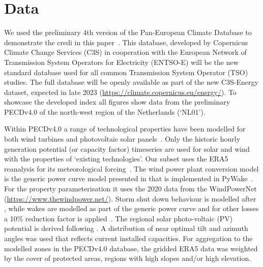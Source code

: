 \documentclass[a4paper,11pt]{extarticle}
\newcommand{\credi}[0]{{\sc credi}}
\begin{document}

\section{Data}\label{secCP2:data}
We used the preliminary 4th version of the Pan-European Climate Database to demonstrate the \credi{} in this paper~\parencite[PECDv4.0;][]{Dubus2022PECD}. 
This database, developed by Copernicus Climate Change Services (C3S) in cooperation with the European Network of Transmission System Operators for Electricity (ENTSO-E) will be the new standard database used for all common Transmission System Operator (TSO) studies. 
The full database will be openly available as part of the new C3S-Energy dataset, expected in late 2023 (\url{https://climate.copernicus.eu/energy/}). 
To showcase the developed index all figures show data from the preliminary PECDv4.0 of the north-west region of the Netherlands (`NL01').

Within PECDv4.0 a range of technological properties have been modelled for both wind turbines and photovoltaic solar panels~\parencite{Dubus2022PECD}. 
Only the historic hourly generation potential (or capacity factor) timeseries are used for solar and wind with the properties of `existing technologies'.  
Our subset uses the ERA5 reanalysis for its meteorological forcing~\parencite{Hersbach2020}. 
The wind power plant conversion model is the generic power curve model presented in \textcite{Murcia2022} that is implemented in PyWake~\parencite{pywake}. 
For the property parameterisation it uses the 2020 data from the WindPowerNet (\url{https://www.thewindpower.net/}). 
Storm shut down behaviour is modelled after \textcite{MurciaLeon2021}, while wakes are modelled as part of the generic power curve and for other losses a 10\% reduction factor is applied~\parencite{Luzia2023}. 
The regional solar photo-voltaic (PV) potential is derived following \textcite{SaintDrenan2018}. 
A distribution of near optimal tilt and azimuth angles was used that reflects current installed capacities. 
For aggregation to the modelled zones in the PECDv4.0 database, the gridded ERA5 data was weighted by the cover of protected areas, regions with high slopes and/or high elevation.





\end{document}

